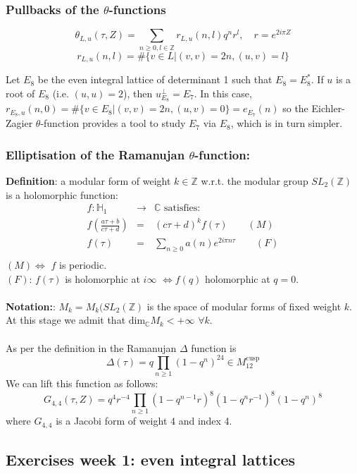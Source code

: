 \documentclass[10pt,a4paper]{article}
\begin{document}
\subsubsection{Pullbacks of the $\theta$-functions}
\[\theta_{L,u}(\tau,Z)=\sum_{n\geq0,l\in\mathbb{Z}}r_{L,u}(n,l)q^nr^l,\quad r=e^{2i\pi Z}\]
\[r_{L,u}(n,l)=\#\{v\in L|(v,v)=2n,(u,v)=l\}\]

Let $E_8$ be the even integral lattice of determinant 1 such that $E_8=E_8^*$. If $u$ is a root of $E_8$ (i.e. $(u,u)=2$), then $u_{E_8}^\bot=E_7$. In this case, $r_{E_8,u}(n,0)=\#\{v\in E_8|(v,v)=2n,(u,v)=0\}=e_{E_7}(n)$ so the Eichler-Zagier $\theta$-function provides a tool to study $E_7$ via $E_8$, which is in turn simpler.\\

\subsubsection{Elliptisation of the Ramanujan $\theta$-function:}
\textbf{Definition}: a modular form of weight $k\in\mathbb{Z}$ w.r.t. the modular group $SL_2(\mathbb{Z})$ is a holomorphic function:
\begin{eqnarray*}
f:\mathbb{H}_1&\rightarrow&\mathbb{C}\textrm{   satisfies:}\\
f\left(\frac{a\tau+b}{c\tau+d}\right)&=&(c\tau+d)^kf(\tau)\qquad(M)\\
f(\tau)&=&\sum_{n\geq 0}a(n)e^{2i\pi n\tau}\qquad(F)\\
\end{eqnarray*}
$(M)\iff$ $f$ is periodic.\\
$(F)$: $f(\tau)$ is holomorphic at $i\infty$ $\iff f(q)$ holomorphic at $q=0$.\\
\\
\textbf{Notation:}: $M_k=M_k(SL_2(\mathbb{Z})$ is the space of modular forms of fixed weight $k$. At this stage we admit that $\textrm{dim}_\mathbb{C}M_k<+\infty$ $\forall k$.\\
\\
As per the definition in \cite{SerreCA} the Ramanujan $\Delta$ function is 
\[\Delta(\tau)=q\prod_{n\geq 1}(1-q^n)^{24}\in M_{12}^{\textrm{cusp}}\]
We can lift this function as follows:
\[G_{4,4}(\tau,Z)=q^4r^{-4}\prod_{n\geq 1}(1-q^{n-1}r)^8(1-q^nr^{-1})^8(1-q^n)^8\]
where $G_{4,4}$ is a Jacobi form of weight 4 and index 4.\\


\subsection{Exercises week 1: even integral lattices}
\end{document}
